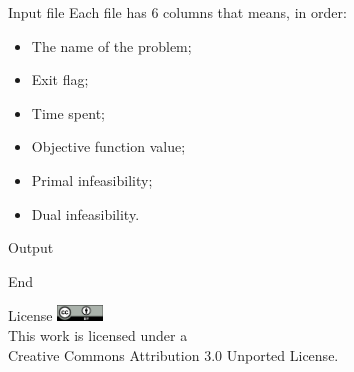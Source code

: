 \documentclass[a0paper,portrait]{baposter}
\begin{document}
\begin{poster}
\begin{posterbox}[column=1]{Input file}
    Each file has 6 columns that means, in order:
    \begin{itemize}
      \item The name of the problem;
      \item Exit flag;
      \item Time spent;
      \item Objective function value;
      \item Primal infeasibility;
      \item Dual infeasibility.
    \end{itemize}
  \end{posterbox}

  \begin{posterbox}[column=1,below=auto]{Output}
    
  \end{posterbox}

  \begin{posterbox}[column=1,below=auto]{End}
    \printbibliography
  \end{posterbox}

  \begin{posterbox}[column=1,below=auto]{License}
    \includegraphics[height=12pt]{figures/cc-by} \\
    This work is licensed under a\\
    Creative Commons Attribution 3.0 Unported License.
  \end{posterbox}
\end{poster}
\end{document}
